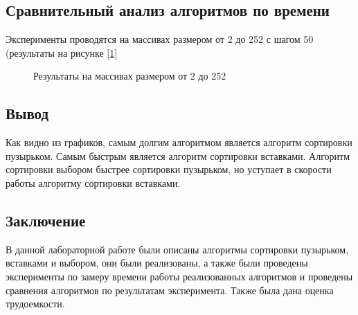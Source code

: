 \documentclass{article}
\begin{document}
	\subsection{Сравнительный анализ алгоритмов по времени}
	Эксперименты проводятся на массивах размером от 2 до 252 с шагом 50 (результаты на рисунке \hyperref[resultShort]{[\ref{resultShort}]}
	\begin{figure}[h!]
		 	\caption{Результаты на массивах размером от 2 до 252}
		 	\label{resultShort}
	 	\end{figure}
	\newpage
	\subsection{Вывод}
	Как видно из графиков, самым долгим алгоритмом является алгоритм сортировки пузырьком. 
	Самым быстрым является алгоритм сортировки вставками. Алгоритм сортировки выбором быстрее 
	сортировки пузырьком, но уступает в скорости работы алгоритму сортировки вставками.

	\newpage
	\begin{center}
		\section*{Заключение}
	\end{center}
	\indent \indent В данной лабораторной работе были описаны алгоритмы сортировки пузырьком, вставками и выбором, они были реализованы, а также были проведены эксперименты по замеру времени работы реализованных алгоритмов и проведены сравнения алгоритмов по результатам эксперимента. Также была дана оценка трудоемкости.
	\newpage
	
\end{document}
